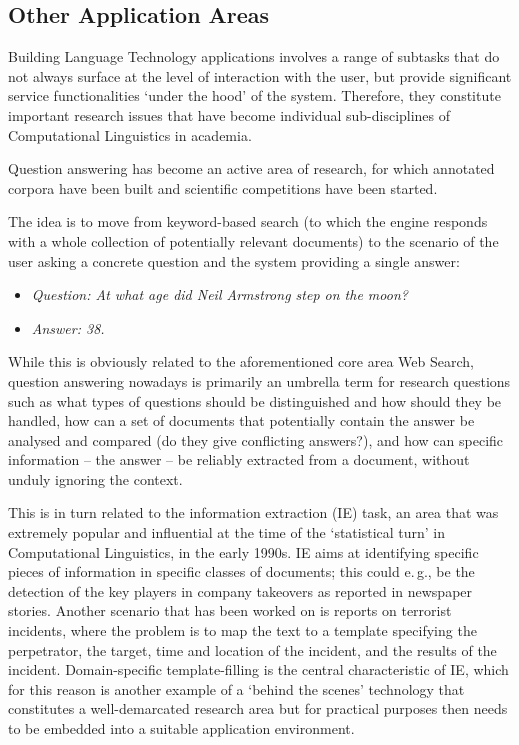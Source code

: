 \begin{multicols}{2}
\subsection{Other Application Areas}

Building Language Technology applications involves a range of subtasks that do not always surface at the level of interaction with the user, but provide significant service functionalities ‘under the hood’ of the system. Therefore, they constitute important research issues that have become individual sub-disciplines of Computational Linguistics in academia. 

Question answering has become an active area of research, for which annotated corpora have been built and scientific competitions have been started.

The idea is to move from keyword-based search (to which the engine responds with a whole collection of potentially relevant documents) to the scenario of the user asking a concrete question and the system providing a single answer:

\begin{itemize}
\item[] \textit{Question: At what age did Neil Armstrong step on the moon?}
\item[] \textit{Answer: 38.}
\end{itemize}

While this is obviously related to the aforementioned core area Web Search, question answering nowadays is primarily an umbrella term for research questions such as what types of questions should be distinguished and how should they be handled, how can a set of documents that potentially contain the answer be analysed and compared (do they give conflicting answers?), and how can specific information -- the answer -- be reliably extracted from a document, without unduly ignoring the context. 


This is in turn related to the information extraction (IE) task, an area that was extremely popular and influential at the time of the ‘statistical turn’ in Computational Linguistics, in the early 1990s. IE aims at identifying specific pieces of information in specific classes of documents; this could e.\,g., be the detection of the key players in company takeovers as reported in newspaper stories. Another scenario that has been worked on is reports on terrorist incidents, where the problem is to map the text to a template specifying the perpetrator, the target, time and location of the incident, and the results of the incident. Domain-specific template-filling is the central characteristic of IE, which for this reason is another example of a ‘behind the scenes’ technology that constitutes a well-demarcated research area but for practical purposes then needs to be embedded into a suitable application environment. 


\end{multicols}
